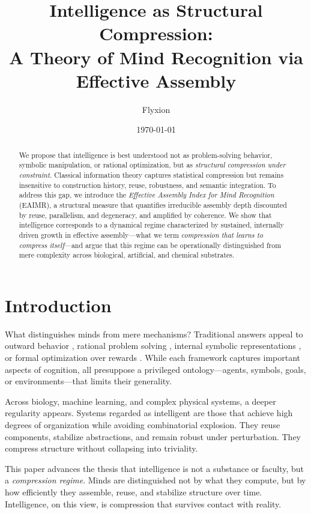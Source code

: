 \documentclass[11pt,letterpaper]{article}
\title{Intelligence as Structural Compression:\\
A Theory of Mind Recognition via Effective Assembly}
\author{Flyxion}
\date{\today}
\begin{document}
\maketitle

\begin{abstract}
We propose that intelligence is best understood not as problem-solving behavior, symbolic manipulation, or rational optimization, but as \emph{structural compression under constraint}. Classical information theory captures statistical compression but remains insensitive to construction history, reuse, robustness, and semantic integration. To address this gap, we introduce the \emph{Effective Assembly Index for Mind Recognition} (EAIMR), a structural measure that quantifies irreducible assembly depth discounted by reuse, parallelism, and degeneracy, and amplified by coherence. We show that intelligence corresponds to a dynamical regime characterized by sustained, internally driven growth in effective assembly—what we term \emph{compression that learns to compress itself}—and argue that this regime can be operationally distinguished from mere complexity across biological, artificial, and chemical substrates.
\end{abstract}

\section{Introduction}

What distinguishes minds from mere mechanisms? Traditional answers appeal to outward behavior \parencite{turing1950}, rational problem solving \parencite{newell1972}, internal symbolic representations \parencite{fodor1975}, or formal optimization over rewards \parencite{hutter2005}. While each framework captures important aspects of cognition, all presuppose a privileged ontology—agents, symbols, goals, or environments—that limits their generality.

Across biology, machine learning, and complex physical systems, a deeper regularity appears. Systems regarded as intelligent are those that achieve high degrees of organization while avoiding combinatorial explosion. They reuse components, stabilize abstractions, and remain robust under perturbation. They compress structure without collapsing into triviality.

This paper advances the thesis that intelligence is not a substance or faculty, but a \emph{compression regime}. Minds are distinguished not by what they compute, but by how efficiently they assemble, reuse, and stabilize structure over time. Intelligence, on this view, is compression that survives contact with reality.
\end{document}
